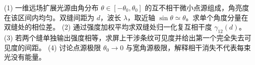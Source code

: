 (1) 一维远场扩展光源由角分布 \(\theta\in[-\theta_0,\theta_0]\) 的互不相干微小点源组成，角亮度在该区间内均匀。双缝间距为 \(d\)，波长 \(\lambda\)，取近轴 \(\sin\theta\simeq\theta\)。求单个角度分量在双缝处的相位差。
(2) 通过强度加权平均求双缝处归一化复互相干度 \(\gamma_{12}(d)\)。
(3) 若两个缝单独输出强度相等，求屏上干涉条纹可见度并给出第一个完全失去可见度的间距。
(4) 讨论点源极限 \(\theta_0\to0\) 与宽角源极限，解释相干消失不代表每束光没有能量。
